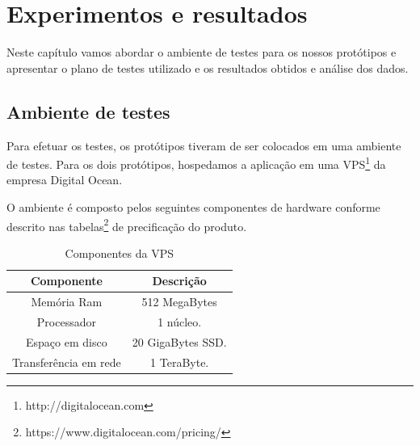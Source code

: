
\chapter{Experimentos e resultados}
\label{experimentos-resultados}

\vspace{-1.9cm}


 Neste capítulo vamos abordar o ambiente de testes para os nossos protótipos e apresentar 
 o plano de testes utilizado e os resultados obtidos e análise dos dados.

\section{Ambiente de testes}
\label{ambientedetestes}

  Para efetuar os testes, os protótipos tiveram de ser colocados em uma ambiente de testes. 
  Para os dois protótipos, hospedamos a aplicação em uma VPS\footnote{http://digitalocean.com} da empresa Digital Ocean.
  
  O ambiente é composto pelos seguintes componentes de hardware conforme descrito nas tabelas\footnote{https://www.digitalocean.com/pricing/}
  de precificação do produto.
  
  \begin{table}[H]
    \centering
    \footnotesize
    \setlength{\abovecaptionskip}{0pt}
    \setlength{\belowcaptionskip}{0pt}
    \caption[Componentes da VPS]{Componentes da VPS}
    \label{tab:components-digital-ocean-vps}
    \begin{tabular}{c|c}
      \hline \hline
      Componente  &	Descrição \\
      \hline \hline
      Memória Ram & 512 MegaBytes \\
      Processador & 1 núcleo. \\
      Espaço em disco & 20 GigaBytes \ac{SSD}. \\
      Transferência em rede & 1 TeraByte. \\
      \hline \hline
    \end{tabular}
  \end{table}


